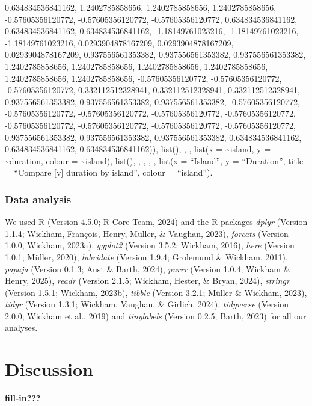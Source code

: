 \documentclass[
  ,man]{apa6}
\begin{document}
0.634834536841162, 1.2402785858656, 1.2402785858656, 1.2402785858656, -0.57605356120772, -0.57605356120772, -0.57605356120772, 0.634834536841162, 0.634834536841162, 0.634834536841162, -1.18149761023216, -1.18149761023216, -1.18149761023216, 0.0293904878167209, 0.0293904878167209, 0.0293904878167209, 0.937556561353382, 0.937556561353382, 0.937556561353382, 1.2402785858656, 1.2402785858656, 1.2402785858656, 1.2402785858656, 1.2402785858656, 1.2402785858656, -0.57605356120772, -0.57605356120772, -0.57605356120772,
0.332112512328941, 0.332112512328941, 0.332112512328941, 0.937556561353382, 0.937556561353382, 0.937556561353382, -0.57605356120772, -0.57605356120772, -0.57605356120772, -0.57605356120772, -0.57605356120772, -0.57605356120772, -0.57605356120772, -0.57605356120772, -0.57605356120772, 0.937556561353382, 0.937556561353382, 0.937556561353382, 0.634834536841162, 0.634834536841162, 0.634834536841162)), list(), , , list(x = \textasciitilde island, y = \textasciitilde duration, colour = \textasciitilde island), list(), , , , , list(x = ``Island'', y = ``Duration'', title = ``Compare {[}v{]} duration by island'', colour = ``island'').

\subsubsection{Data analysis}\label{data-analysis}

We used R (Version 4.5.0; R Core Team, 2024) and the R-packages \emph{dplyr} (Version 1.1.4; Wickham, François, Henry, Müller, \& Vaughan, 2023), \emph{forcats} (Version 1.0.0; Wickham, 2023a), \emph{ggplot2} (Version 3.5.2; Wickham, 2016), \emph{here} (Version 1.0.1; Müller, 2020), \emph{lubridate} (Version 1.9.4; Grolemund \& Wickham, 2011), \emph{papaja} (Version 0.1.3; Aust \& Barth, 2024), \emph{purrr} (Version 1.0.4; Wickham \& Henry, 2025), \emph{readr} (Version 2.1.5; Wickham, Hester, \& Bryan, 2024), \emph{stringr} (Version 1.5.1; Wickham, 2023b), \emph{tibble} (Version 3.2.1; Müller \& Wickham, 2023), \emph{tidyr} (Version 1.3.1; Wickham, Vaughan, \& Girlich, 2024), \emph{tidyverse} (Version 2.0.0; Wickham et al., 2019) and \emph{tinylabels} (Version 0.2.5; Barth, 2023) for all our analyses.

\section{Discussion}\label{discussion}

\textbf{fill-in???}
\end{document}
